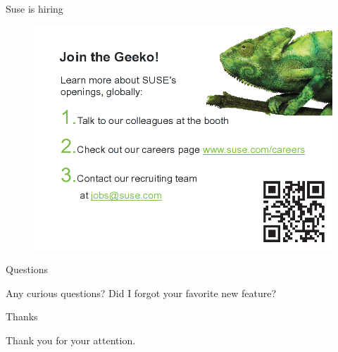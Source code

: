 \documentclass{beamer}
\begin{document}
\begin{frame}{Suse is hiring}
	\begin{figure}
	\includegraphics[width= 0.8\linewidth]{suse_hiring.png}
	\end{figure}
\end{frame}

\begin{frame}{Questions}
	\begin{center}
	Any curious questions? Did I forgot your favorite new feature?
	\end{center}
\end{frame}

\begin{frame}{Thanks}
	\begin{center}
	Thank you for your attention.
	\end{center}
\end{frame}
\end{document}

